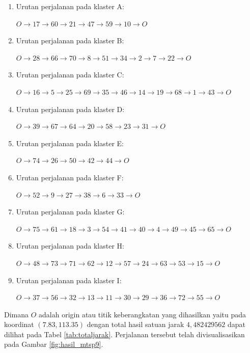 \begin{enumerate}
\item Urutan perjalanan pada klaster A:

$O \to 17 \to 60 \to 21 \to 47 \to 59 \to 10 \to O$

\item Urutan perjalanan pada klaster B:

$O \to 28 \to 66 \to 70 \to 8 \to 51 \to 34 \to 2 \to 7 \to 22 \to O$

\item Urutan perjalanan pada klaster C:

$O \to 16 \to 5 \to 25 \to 69 \to 35 \to 46 \to 14 \to 19 \to 68 \to 1 \to 43 \to O$

\item Urutan perjalanan pada klaster D:

$O \to 39 \to 67 \to 64 \to 20 \to 58 \to 23 \to 31 \to O$

\item Urutan perjalanan pada klaster E:

$O \to 74 \to 26 \to 50 \to 42 \to 44 \to O$

\item Urutan perjalanan pada klaster F:

$O \to 52 \to 9 \to 27 \to 38 \to 6 \to 33 \to O$

\item Urutan perjalanan pada klaster G:

$O \to 75 \to 61 \to 18 \to 3 \to 54 \to 41 \to 40 \to 4 \to 49 \to 45 \to 65 \to O$

\item Urutan perjalanan pada klaster H:

$O \to 48 \to 73 \to 71 \to 62 \to 12 \to 57 \to 24 \to 63 \to 53 \to 15 \to O$

\item Urutan perjalanan pada klaster I:

$O \to 37 \to 56 \to 32 \to 13 \to 11 \to 30 \to 29 \to 36 \to 72 \to 55 \to O$

\end{enumerate}

Dimana $O$ adalah origin atau titik keberangkatan yang dihasilkan yaitu pada koordinat $(7.83, 113.35)$ dengan total hasil satuan jarak $4,482429562$ dapat dilihat pada Tabel \ref{tab:totaljarak}. Perjalanan tersebut telah divisualisasikan pada Gambar \ref{fig:hasil_mtsp9}.

